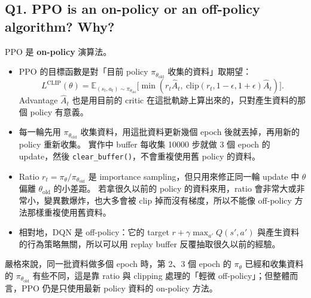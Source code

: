 \documentclass[11pt,a4paper]{article}
\begin{document}
\subsection*{Q1. PPO is an on-policy or an off-policy algorithm? Why?}
PPO 是 \textbf{on-policy} 演算法。
\begin{itemize}[leftmargin=1.2em]
  \item PPO 的目標函數是對「目前 policy $\pi_{\theta_\text{old}}$ 收集的資料」取期望：
        \[L^{\text{CLIP}}(\theta)=\mathbb{E}_{(s_t,a_t)\sim\pi_{\theta_\text{old}}}\big[\min(r_t\hat A_t,\ \mathrm{clip}(r_t,1-\epsilon,1+\epsilon)\hat A_t)\big].\]
        Advantage $\hat A_t$ 也是用目前的 critic 在這批軌跡上算出來的，只對產生資料的那個 policy 有意義。
  \item 每一輪先用 $\pi_{\theta_\text{old}}$ 收集資料，用這批資料更新幾個 epoch 後就丟掉，再用新的 policy 重新收集。
        實作中 buffer 每收集 10000 步就做 3 個 epoch 的 update，然後 \texttt{clear\_buffer()}，不會重複使用舊 policy 的資料。
  \item Ratio $r_t=\pi_\theta/\pi_{\theta_\text{old}}$ 是 importance sampling，但只用來修正同一輪 update 中 $\theta$ 偏離 $\theta_\text{old}$ 的小差距。
        若拿很久以前的 policy 的資料來用，ratio 會非常大或非常小，變異數爆炸，也大多會被 clip 掉而沒有梯度，所以不能像 off-policy 方法那樣重複使用舊資料。
  \item 相對地，DQN 是 off-policy：它的 target $r+\gamma\max_{a'}Q(s',a')$ 與產生資料的行為策略無關，所以可以用 replay buffer 反覆抽取很久以前的經驗。
\end{itemize}
嚴格來說，同一批資料做多個 epoch 時，第 2、3 個 epoch 的 $\pi_\theta$ 已經和收集資料的 $\pi_{\theta_\text{old}}$ 有些不同，這是靠 ratio 與 clipping 處理的「輕微 off-policy」；但整體而言，PPO 仍是只使用最新 policy 資料的 on-policy 方法。
\end{document}
